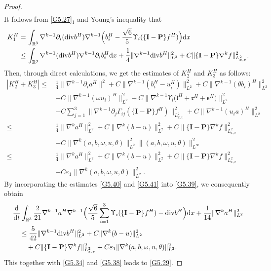 \documentclass[reqno,11pt]{amsart}
\theoremstyle{plain}
\numberwithin{equation}{section}
\newcommand{\eps}{{\varepsilon}}
\begin{document}
\begin{proof}
\begin{align}
\end{align}
It follows from \eqref{G5.27}$_1$ and Young's inequality that
\begin{align}\label{G5.40}
K_1^H
=&\,\int_{\mathbb{R}^3} \nabla^{k-1} \partial_i ({\rm div} b^H) \nabla^{k-1} \Big(b^H_i-\frac{\sqrt{6}}{5} \Upsilon_i(\{\mathbf{I}-\mathbf{P}\} f^H)\Big) \mathrm{d} x\nonumber\\
\leq&\, \int_{\mathbb{R}^3} \nabla^{k-1} ({\rm div}   b^H) \nabla^{k-1} \partial_i b^H_i \mathrm{d} x+\frac{1}{4} \|\nabla^{k-1} {\rm div}   b^H \|_{L^2}^2+C\|\{\mathbf{I}-\mathbf{P}\} \nabla^k f\|_{L_{x,v}^2}^2.
\end{align}
Then, through  direct calculations, we get  the estimates of $K_2^H$ and $K_3^H$ as follows: 
\begin{align}\label{G5.41}
 |K_2^H+K_3^H |
\leq \,&\frac{1}{4}\|\nabla^{k-1} \partial_i a^H\|^2+C  \|\nabla^{k-1} (b^H_i-u^H_i ) \|_{L^2}^2+C \|\nabla^{k-1}  (\theta b_i)^H \|_{L^2}^2 \nonumber\\
& +C\|\nabla^{k-1} (\omega u_i)^H\|_{L^2}^2+C\big\|\nabla^{k-1} \Upsilon_i\big(\mathfrak{l}^H+\mathfrak{r}^H+\mathfrak{s}^H\big) \big\|_{L ^2}^2 \nonumber\\
&+C\sum_{j=1}^3 \|\nabla^{k-1} \partial_j \Gamma_{i j}(\{\mathbf{I}-\mathbf{P}\} f^H) \|_{L_{x,v}^2}^2+C \|\nabla^{k-1} (u_i a)^H\|_{L^2}^2\nonumber\\
\leq\, &\frac{1}{4} \|\nabla^k a^H \|_{L^2}^2+C\|\nabla^k(b-u)\|_{L^2}^2+C\|\{\mathbf{I}-\mathbf{P}\} \nabla^k f\|_{L_{x,v}^2}^2\nonumber\\
&+C\|\nabla^k (a, b,\omega,u,\theta)\|_{L^2}^2\|(a, b,\omega,u,\theta)\|_{L^\infty}^2\nonumber\\
\leq\, &\frac{1}{4} \|\nabla^k a^H \|_{L^2}^2+C\|\nabla^k(b-u)\|_{L^2}^2+C\|\{\mathbf{I}-\mathbf{P}\} \nabla^k f\|_{L_{x,v}^2}^2\nonumber\\
&+C\eps_1\|\nabla^k (a, b,\omega,u,\theta)\|_{L^2}^2.
\end{align}
By incorporating the estimates \eqref{G5.40} and \eqref{G5.41} into \eqref{G5.39}, we consequently obtain   
\begin{align*}
& \frac{\mathrm{d}}{\mathrm{d} t}   \int_{\mathbb{R}^3} \frac{2}{21} \nabla^{k-1} a^H \nabla^{k-1} \Big(\frac{\sqrt{6}}{5}\sum_{i=1}^3 \Upsilon_i(\{\mathbf{I}-\mathbf{P}\} f^H )-{\rm div}   b^H  \Big) \mathrm{d} x+\frac{1}{14}   \|\nabla^{k} a^H  \|_{L^2}^2\nonumber \\
&\quad \leq \frac{5}{42}   \|\nabla^{k-1} {\rm div}   b^H \|_{L^2}^2+C\|\nabla^{k}(b-u)\|_{L^2}^2\nonumber\\
& \qquad +C\|\{\mathbf{I}-\mathbf{P}\}\nabla^k f\|_{L_{x,v}^2}^2 +C\eps_1\|\nabla^k (a, b,\omega,u,\theta)\|_{L^2}^2.     
\end{align*}
This together with \eqref{G5.34} and \eqref{G5.38} leads to \eqref{G5.29}.
\end{proof}
\end{document}
